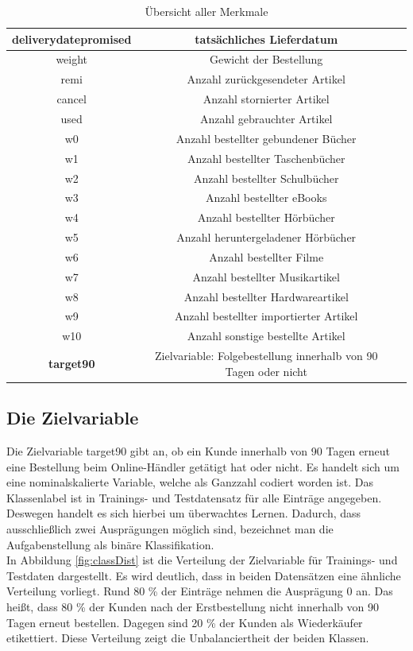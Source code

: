\begin{table}[]
\begin{tabular*}{\textwidth}{c @{\extracolsep{\fill}} cc}
 \hline
 deliverydatepromised & tatsächliches Lieferdatum\\
 \hline
 weight & Gewicht der Bestellung\\
 \hline
 remi & Anzahl zurückgesendeter Artikel\\
 \hline
 cancel & Anzahl stornierter Artikel\\
 \hline
 used & Anzahl gebrauchter Artikel\\
 \hline
 w0 & Anzahl bestellter gebundener Bücher\\
 \hline
 w1 & Anzahl bestellter Taschenbücher\\
 \hline
 w2 & Anzahl bestellter Schulbücher\\
 \hline
 w3 & Anzahl bestellter eBooks\\
 \hline
 w4 & Anzahl bestellter Hörbücher\\
 \hline
 w5 & Anzahl heruntergeladener Hörbücher\\
 \hline
 w6 & Anzahl bestellter Filme\\
 \hline
 w7 & Anzahl bestellter Musikartikel\\
 \hline
 w8 & Anzahl bestellter Hardwareartikel\\
 \hline
 w9 & Anzahl bestellter importierter Artikel\\
 \hline
 w10 & Anzahl sonstige bestellte Artikel\\
 \hline
 \textbf{target90} & Zielvariable: Folgebestellung innerhalb von 90 Tagen oder nicht\\
\bottomrule
\end{tabular*}
\label{table: Features}
\caption{Übersicht aller Merkmale}
\end{table}
\FloatBarrier
\pagebreak
\subsection{Die Zielvariable}

Die Zielvariable target90 gibt an, ob ein Kunde innerhalb von 90 Tagen erneut eine Bestellung beim Online-Händler getätigt hat oder nicht. Es handelt sich um eine nominalskalierte Variable, welche als Ganzzahl codiert worden ist. Das Klassenlabel ist in Trainings- und Testdatensatz für alle Einträge angegeben. Deswegen handelt es sich hierbei um überwachtes Lernen. Dadurch, dass ausschließlich zwei Ausprägungen möglich sind, bezeichnet man die Aufgabenstellung als binäre Klassifikation.\\

In Abbildung \ref{fig:classDist} ist die Verteilung der Zielvariable für Trainings- und Testdaten dargestellt. Es wird deutlich, dass in beiden Datensätzen eine ähnliche Verteilung vorliegt. Rund 80 \% der Einträge nehmen die Ausprägung 0 an. Das heißt, dass 80 \% der Kunden nach der Erstbestellung nicht innerhalb von 90 Tagen erneut bestellen. Dagegen sind 20 \% der Kunden als Wiederkäufer etikettiert. Diese Verteilung zeigt die Unbalanciertheit der beiden Klassen.\\

